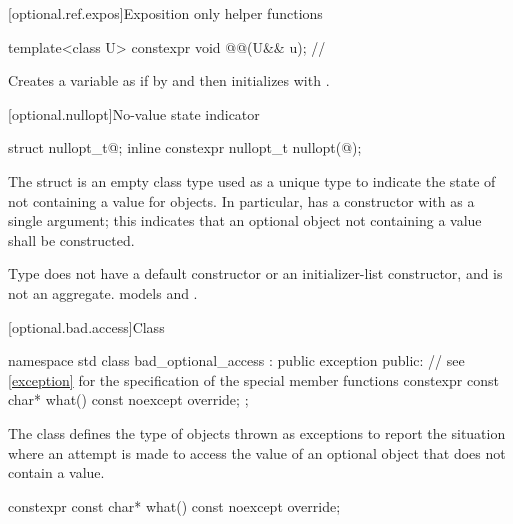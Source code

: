 [optional.ref.expos]{Exposition only helper functions}

\begin{itemdecl}
template<class U>
  constexpr void @@(U&& u);  // \expos
\end{itemdecl}

\begin{itemdescr}
\pnum
\effects
Creates a variable  as if by 
and then initializes  with .
\end{itemdescr}

[optional.nullopt]{No-value state indicator}

%
%
\begin{itemdecl}
struct nullopt_t{@\seebelow@};
inline constexpr nullopt_t nullopt(@\unspec@);
\end{itemdecl}

\pnum
The struct  is an empty class type used as a unique type to indicate the state of not containing a value for  objects.
In particular,  has a constructor with  as a single argument;
this indicates that an optional object not containing a value shall be constructed.

\pnum
Type  does not have
a default constructor or an initializer-list constructor, and
is not an aggregate.
 models  and
.

[optional.bad.access]{Class }

\begin{codeblock}
namespace std {
  class bad_optional_access : public exception {
  public:
    // see \ref{exception} for the specification of the special member functions
    constexpr const char* what() const noexcept override;
  };
}
\end{codeblock}

\pnum
The class  defines the type of objects thrown as exceptions to report the situation where an attempt is made to access the value of an optional object that does not contain a value.

%
\begin{itemdecl}
constexpr const char* what() const noexcept override;
\end{itemdecl}

